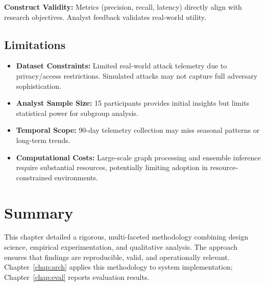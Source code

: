 \textbf{Construct Validity:} Metrics (precision, recall, latency) directly align with research objectives. Analyst feedback validates real-world utility.

\subsection{Limitations}
\begin{itemize}
    \item \textbf{Dataset Constraints:} Limited real-world attack telemetry due to privacy/access restrictions. Simulated attacks may not capture full adversary sophistication.
    \item \textbf{Analyst Sample Size:} 15 participants provides initial insights but limits statistical power for subgroup analysis.
    \item \textbf{Temporal Scope:} 90-day telemetry collection may miss seasonal patterns or long-term trends.
    \item \textbf{Computational Costs:} Large-scale graph processing and ensemble inference require substantial resources, potentially limiting adoption in resource-constrained environments.
\end{itemize}

\section{Summary}
This chapter detailed a rigorous, multi-faceted methodology combining design science, empirical experimentation, and qualitative analysis. The approach ensures that findings are reproducible, valid, and operationally relevant. Chapter~\ref{chap:arch} applies this methodology to system implementation; Chapter~\ref{chap:eval} reports evaluation results.
